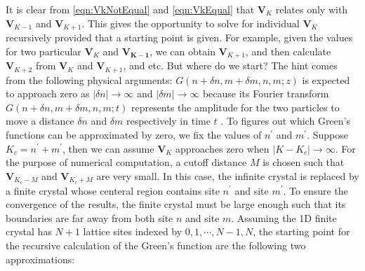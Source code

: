  It is clear from 
\autoref{eqn:VkNotEqual} and \autoref{eqn:VkEqual} that $\mathbf{V}_{K}$ relates only with  $\mathbf{V}_{K-1}$ and 
 $\mathbf{V}_{K+1}$. This gives the opportunity to solve for individual $\mathbf{V}_{K}$ recursively provided that 
a starting point is given. For example, given the values for two particular $\mathbf{V}_{K}$ and 
$\mathbf{V_{K-1}}$, we can obtain $\mathbf{V}_{K+1}$, and then calculate $\mathbf{V}_{K+2}$ from $\mathbf{V}_{K}$ 
and $\mathbf{V}_{K+1}$, and etc.  
But where do we start? The hint comes from the following physical arguments: $G(n+\delta n, m+\delta m, n, m; z)$ is 
expected to approach zero as $|\delta n| \rightarrow \infty$ and $|\delta m| \rightarrow \infty$ because its Fourier
transform $G(n+\delta n, m+\delta m, n, m; t)$ represents the amplitude for the two particles to move a distance
 $\delta n$ and  $\delta m$ respectively in time $t$ \cite{economou2006, Berciu2010}. To figures out which Green's 
functions can be approximated by zero, we fix  the values of $n^{\prime}$ and $m^{\prime}$. Suppose
 $K_c = n^{\prime} + m^{\prime}$, then we can assume $\mathbf{V}_{K}$ approaches zero when 
$|K - K_c | \rightarrow \infty$. For the purpose of numerical computation, a cutoff distance $M$ is chosen such that
$\mathbf{V}_{K_c - M}$ and $\mathbf{V}_{K_c + M}$ are very small. In this case, the infinite crystal is 
replaced by a finite crystal whose centeral region contains site $n^{\prime}$ and site $m^{\prime}$. To ensure the
convergence of the results, the finite crystal must be large enough such that its boundaries are  far away
from both site $n$ and site $m$. Assuming the 1D finite crystal has $N+1$ lattice sites indexed by $0, 1, \cdots, 
N-1, N$, the starting point for the recursive calculation of the Green's function are the following two 
approximations:

